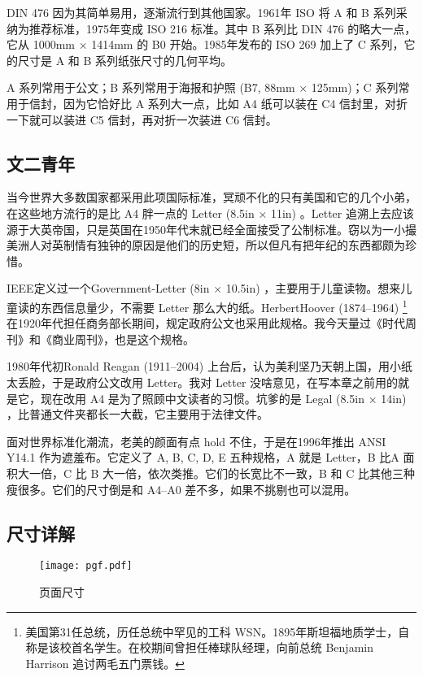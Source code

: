 DIN 476 因为其简单易用，逐渐流行到其他国家。1961年 ISO 将 A 和 B 系列采纳为推荐标准，1975年变成 ISO 216 标准。其中 B 系列比 DIN 476 的略大一点，它从 1000mm × 1414mm 的 B0 开始。1985年发布的 ISO 269 加上了 C 系列，它的尺寸是 A 和 B 系列纸张尺寸的几何平均。

A 系列常用于公文；B 系列常用于海报和护照 (B7, 88mm × 125mm)；C 系列常用于信封，因为它恰好比 A 系列大一点，比如 A4 纸可以装在 C4 信封里，对折一下就可以装进 C5 信封，再对折一次装进 C6 信封。

\subsection{文二青年}

当今世界大多数国家都采用此项国际标准，冥顽不化的只有美国和它的几个小弟，在这些地方流行的是比 A4 胖一点的 Letter (8.5in × 11in) 。Letter 追溯上去应该源于大英帝国，只是英国在1950年代末就已经全面接受了公制标准。窃以为一小撮美洲人对英制情有独钟的原因是他们的历史短，所以但凡有把年纪的东西都颇为珍惜。

IEEE\indexIEEE{}定义过一个Government-Letter (8in × 10.5in) ，主要用于儿童读物。想来儿童读的东西信息量少，不需要 Letter 那么大的纸。Herbert\linebreak Hoover (1874--1964)\indexHoover{} \footnote{美国第31任总统，历任总统中罕见的工科 WSN。1895年斯坦福地质学士，自称是该校首名学生。在校期间曾担任棒球队经理，向前总统 Benjamin Harrison 追讨两毛五门票钱。} 在1920年代担任商务部长期间，规定政府公文也采用此规格。我今天量过《时代周刊》和《商业周刊》，也是这个规格。

1980年代初Ronald Reagan (1911--2004)\indexReagon{} 上台后，认为美利坚乃天朝上国，用小纸太丢脸，于是政府公文改用 Letter。我对 Letter 没啥意见，在写本章之前用的就是它，现在改用 A4 是为了照顾中文读者的习惯。坑爹的是 Legal (8.5in × 14in) ，比普通文件夹都长一大截，它主要用于法律文件。

面对世界标准化潮流，老美的颜面有点 hold 不住，于是在1996年推出 ANSI Y14.1 作为遮羞布。它定义了 A, B, C, D, E 五种规格，A 就是 Letter，B 比A 面积大一倍，C 比 B 大一倍，依次类推。它们的长宽比不一致，B 和 C 比其他三种瘦很多。它们的尺寸倒是和 A4--A0 差不多，如果不挑剔也可以混用。

\subsection{尺寸详解}

\begin{figure}[!htbp]
\centering
\texttt{[image: pgf.pdf]}
\caption{页面尺寸}
\label{fig:pagelayout}
\end{figure}

